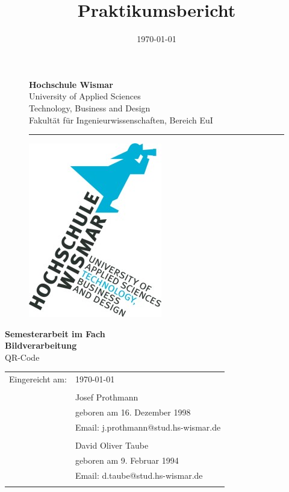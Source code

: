 \documentclass[12pt,					%
							 oneside,			%
							 a4paper,			%
							 halfparskip,		%
							 liststotoc,			%
							 bibtotoc,			%
							 fleqn,				%
							 pointlessnumbers]	%
							 {scrreprt}
\title{Praktikumsbericht}
\author{\Verfasserj}
\date{\today{}}
\makeatletter
\newcommand{\VerfasserJ}{Josef Prothmann}
\newcommand{\EmailJ}{j.prothmann@stud.hs-wismar.de}
\newcommand{\GeburtstagJ}{16. Dezember 1998}
\newcommand{\VerfasserD}{David Oliver Taube}
\newcommand{\EmailD}{d.taube@stud.hs-wismar.de}
\newcommand{\GeburtstagD}{9. Februar 1994}
\newcommand{\Titel}{QR-Code}
\makeatother
\begin{document}

	\renewcommand\lstlistingname{Code}
	\renewcommand\lstlistlistingname{Codeverzeichnis}
	
	\begin{titlepage}
		\setlength\headsep{-5mm}
		\begin{figure}[!h]
			\begin{minipage}{0.8\textwidth}
				\textbf{Hochschule Wismar} \\
				University of Applied Sciences \\
				Technology, Business and Design \\
				Fakultät für Ingenieurwissenschaften, Bereich EuI \\
			\rule{\textwidth}{0.5pt}
			\end{minipage}
			\begin{minipage}[r]{0.1\textwidth}
				\begin{flushright}
					\includegraphics[height=6\baselineskip]{pictures/HS-Wismar_Logo-FIW_2010-01.jpg}
				\end{flushright}
			\end{minipage}
		\end{figure}
		\vspace*{6cm}
		\begin{center}
			\Huge
			\textbf{Semesterarbeit im Fach\\ Bildverarbeitung} \\
			\vspace{2cm}
			\large \Titel
			\begin{table}[b]
				\begin{tabular}{rl}
					
					Eingereicht am: &\today \\
					\\
					& \VerfasserJ \\ 
					& geboren am \GeburtstagJ \\ 
					& Email: \EmailJ \\
					\\	
					& \VerfasserD\\ 
					& geboren am \GeburtstagD \\ 
					& Email: \EmailD \\
					\\


\end{tabular}
\end{table}
\end{center}
\end{titlepage}
\end{document}
